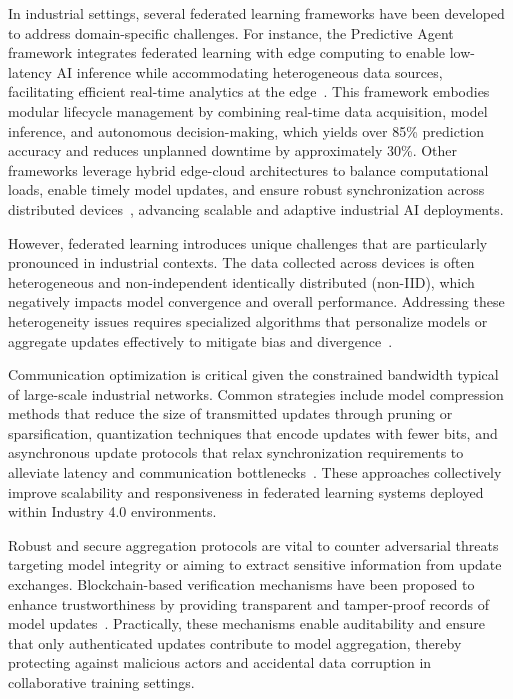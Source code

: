 \documentclass[sigconf]{acmart}
\begin{document}
In industrial settings, several federated learning frameworks have been developed to address domain-specific challenges. For instance, the Predictive Agent framework integrates federated learning with edge computing to enable low-latency AI inference while accommodating heterogeneous data sources, facilitating efficient real-time analytics at the edge~\cite{ref37}. This framework embodies modular lifecycle management by combining real-time data acquisition, model inference, and autonomous decision-making, which yields over 85\% prediction accuracy and reduces unplanned downtime by approximately 30\%. Other frameworks leverage hybrid edge-cloud architectures to balance computational loads, enable timely model updates, and ensure robust synchronization across distributed devices~\cite{ref36}, advancing scalable and adaptive industrial AI deployments.

However, federated learning introduces unique challenges that are particularly pronounced in industrial contexts. The data collected across devices is often heterogeneous and non-independent identically distributed (non-IID), which negatively impacts model convergence and overall performance. Addressing these heterogeneity issues requires specialized algorithms that personalize models or aggregate updates effectively to mitigate bias and divergence~\cite{ref36}.

Communication optimization is critical given the constrained bandwidth typical of large-scale industrial networks. Common strategies include model compression methods that reduce the size of transmitted updates through pruning or sparsification, quantization techniques that encode updates with fewer bits, and asynchronous update protocols that relax synchronization requirements to alleviate latency and communication bottlenecks~\cite{ref36}. These approaches collectively improve scalability and responsiveness in federated learning systems deployed within Industry 4.0 environments.

Robust and secure aggregation protocols are vital to counter adversarial threats targeting model integrity or aiming to extract sensitive information from update exchanges. Blockchain-based verification mechanisms have been proposed to enhance trustworthiness by providing transparent and tamper-proof records of model updates~\cite{ref38}. Practically, these mechanisms enable auditability and ensure that only authenticated updates contribute to model aggregation, thereby protecting against malicious actors and accidental data corruption in collaborative training settings.
\end{document}
